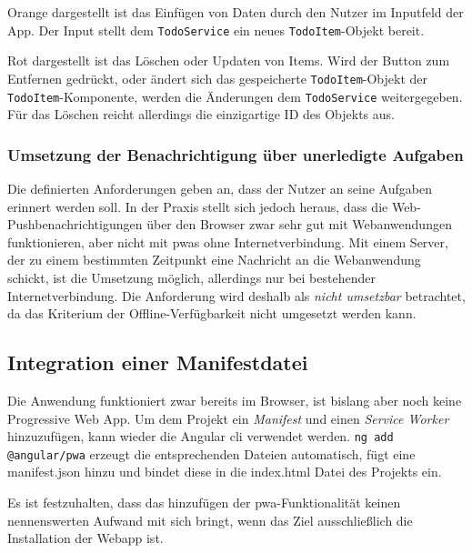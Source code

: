 Orange dargestellt ist das Einfügen von Daten durch den Nutzer im Inputfeld der App. Der Input stellt dem \texttt{TodoService} ein neues \texttt{TodoItem}-Objekt bereit.

Rot dargestellt ist das Löschen oder Updaten von Items. Wird der Button zum Entfernen gedrückt, oder ändert sich das gespeicherte \texttt{TodoItem}-Objekt der \texttt{TodoItem}-Komponente, werden die Änderungen dem \texttt{TodoService} weitergegeben.
Für das Löschen reicht allerdings die einzigartige ID des Objekts aus.

\subsubsection{Umsetzung der Benachrichtigung über unerledigte Aufgaben}
Die definierten Anforderungen geben an, dass der Nutzer an seine Aufgaben erinnert werden soll. In der Praxis stellt sich jedoch heraus, dass die Web-Pushbenachrichtigungen über den Browser zwar sehr gut mit Webanwendungen funktionieren, aber nicht mit \ac{pwa}s ohne Internetverbindung. Mit einem Server, der zu einem bestimmten Zeitpunkt eine Nachricht an die Webanwendung schickt, ist die Umsetzung möglich, allerdings nur bei bestehender Internetverbindung. Die Anforderung wird deshalb als \textit{nicht umsetzbar} betrachtet, da das Kriterium der Offline-Verfügbarkeit nicht umgesetzt werden kann.



\subsection{Integration einer Manifestdatei}

Die Anwendung funktioniert zwar bereits im Browser, ist bislang aber noch keine Progressive Web App. Um dem Projekt ein \textit{Manifest} und einen \textit{Service Worker} hinzuzufügen, kann wieder die Angular \ac{cli} verwendet werden. \texttt{ng add @angular/pwa} erzeugt die entsprechenden Dateien automatisch, fügt eine manifest.json hinzu und bindet diese in die index.html Datei des Projekts ein.

Es ist festzuhalten, dass das hinzufügen der \ac{pwa}-Funktionalität keinen nennenswerten Aufwand mit sich bringt, wenn das Ziel ausschließlich die Installation der Webapp ist.

